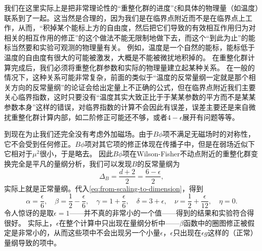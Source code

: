 \documentclass[hyperref, UTF8, a4paper]{ctexart}
\begin{document}
我们在这里实际上是把非常理论性的“重整化群的进度”$\xi$和具体的物理量（如温度）联系到了一起。这当然是合理的，因为我们是在临界点附近而不是在临界点上工作，从而，“积掉某个能标上方的自由度，然后把它们导致的有效相互作用归为对相关的相互作用的修正”的这个做法不能无限制地做下去，而这个“到此为止”的能标当然要和实验可观测的物理量有关。
例如，温度是一个自然的能标，能标低于温度的自由度有很大的可能被激发，大概是不能被微扰地积掉的。
在重整化群计算完成后，我们必须将重整化群参数和实际的物理量建立起某种关系。
在一般的情况下，这种关系可能非常复杂，前面的类似于“温度的反常量纲一定就是那个相关方向的反常量纲”的论证会给出定量上不正确的公式，但在临界点附近我们主要关心临界指数，这时只要没有“温度其实大致正比于于某某参数的平方而不是某某参数本身”这样的错误，对临界指数的计算不会因此有误差，误差主要还是来自微扰重整化群计算内部，如二阶修正可能还不够，或者$4-\epsilon$展开有问题等等。

到现在为止我们还完全没有考虑外加磁场。由于$B \phi$项不满足无磁场时的对称性，它不会受到任何修正。$B \phi$项对其它项的修正体现在传播子中，但是在弱场近似下它相对于$\mu^2$很小，于是略去。
因此$B \phi$项在Wilson-Fisher不动点附近的重整化群变换完全是平凡的量纲分析，我们可以发现$B$的反常量纲为
\begin{equation}
    \Delta_B = \frac{d+2}{2} = \frac{6-\epsilon}{2},
\end{equation}
实际上就是正常量纲。代入\eqref{eq:from-scaling-to-dimension}，得到
\begin{equation}
    \alpha = \frac{\epsilon}{6}, \quad \beta = \frac{1}{2} - \frac{\epsilon}{6}, \quad \gamma = 1 + \frac{\epsilon}{6}, \quad \delta = 3 + \epsilon, \quad \nu = \frac{1}{2} + \frac{\epsilon}{12}, \quad \eta = 0.
\end{equation}
令人惊讶的是取$\epsilon=1$——并不真的非常小的一个值——得到的结果和实验符合得很好。
实际上，$\epsilon$在整个计算中只出现在量纲分析中——$\beta$函数中的圈图修正被假定是非常小的，从而这些项中不会出现另一个小量$\epsilon$，$\epsilon$只出现在$\epsilon g$这样的（正常）量纲导致的项中。
\end{document}
